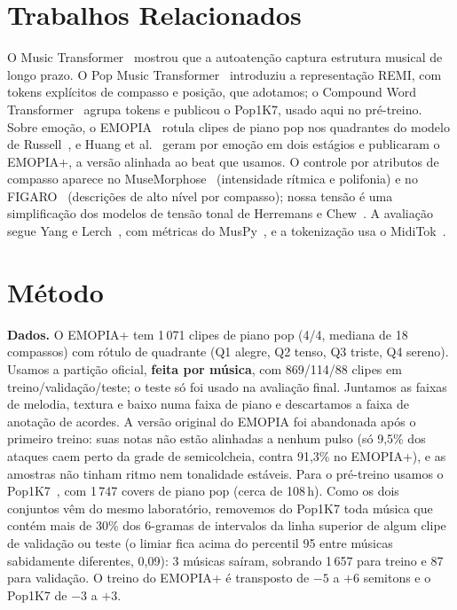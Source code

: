 \documentclass{article}
\begin{document}
\section{Trabalhos Relacionados}\label{sec:relacionados}

O Music Transformer~\cite{huang2019music} mostrou que a autoatenção captura estrutura musical de longo prazo. O Pop Music Transformer~\cite{huang2020pop} introduziu a representação REMI, com tokens explícitos de compasso e posição, que adotamos; o Compound Word Transformer~\cite{hsiao2021compound} agrupa tokens e publicou o Pop1K7, usado aqui no pré-treino. Sobre emoção, o EMOPIA~\cite{hung2021emopia} rotula clipes de piano pop nos quadrantes do modelo de Russell~\cite{russell1980}, e Huang et al.~\cite{huang2024emotion} geram por emoção em dois estágios e publicaram o EMOPIA+, a versão alinhada ao beat que usamos. O controle por atributos de compasso aparece no MuseMorphose~\cite{wu2023musemorphose} (intensidade rítmica e polifonia) e no FIGARO~\cite{vonrutte2023figaro} (descrições de alto nível por compasso); nossa tensão é uma simplificação dos modelos de tensão tonal de Herremans e Chew~\cite{herremans2016tension}. A avaliação segue Yang e Lerch~\cite{yang2020evaluation}, com métricas do MusPy~\cite{dong2020muspy}, e a tokenização usa o MidiTok~\cite{fradet2021miditok}.

\section{Método}\label{sec:metodo}

\textbf{Dados.} O EMOPIA+ tem 1\,071 clipes de piano pop (4/4, mediana de 18 compassos) com rótulo de quadrante (Q1 alegre, Q2 tenso, Q3 triste, Q4 sereno). Usamos a partição oficial, \textbf{feita por música}, com 869/114/88 clipes em treino/validação/teste; o teste só foi usado na avaliação final. Juntamos as faixas de melodia, textura e baixo numa faixa de piano e descartamos a faixa de anotação de acordes. A versão original do EMOPIA foi abandonada após o primeiro treino: suas notas não estão alinhadas a nenhum pulso (só 9,5\% dos ataques caem perto da grade de semicolcheia, contra 91,3\% no EMOPIA+), e as amostras não tinham ritmo nem tonalidade estáveis. Para o pré-treino usamos o Pop1K7~\cite{hsiao2021compound}, com 1\,747 covers de piano pop (cerca de 108\,h). Como os dois conjuntos vêm do mesmo laboratório, removemos do Pop1K7 toda música que contém mais de 30\% dos 6-gramas de intervalos da linha superior de algum clipe de validação ou teste (o limiar fica acima do percentil 95 entre músicas sabidamente diferentes, 0,09): 3 músicas saíram, sobrando 1\,657 para treino e 87 para validação. O treino do EMOPIA+ é transposto de $-5$ a $+6$ semitons e o Pop1K7 de $-3$ a $+3$.
\end{document}
